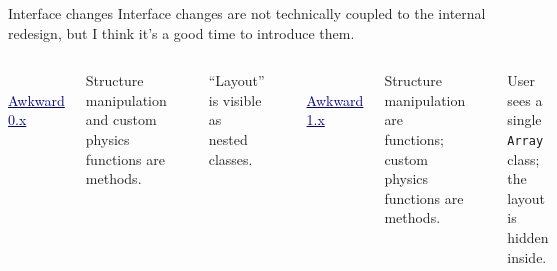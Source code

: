 \documentclass[aspectratio=169]{beamer}
\begin{document}
\begin{frame}[fragile]{Interface changes}
\Large
\vspace{0.25 cm}
Interface changes are not technically coupled to the internal redesign, but I think it's a good time to introduce them.

\normalsize
\vspace{0.5 cm}
\begin{columns}
\mbox{ } \hfill \textcolor{darkblue}{\Large\underline{Awkward 0.x}} \hfill \mbox{ }

\vspace{0.2 cm}
Structure manipulation and custom physics functions are methods.

\small
\begin{verbatim}

x.cross(y)  # cross-join
x.cross(y)  # 3D cross-product
x.colname   # column data
\end{verbatim}

\normalsize
\vspace{0.1 cm}
``Layout'' is visible as nested classes.
\vspace{\baselineskip}

\small
\begin{verbatim}
ChunkedArray(JaggedArray(...))
\end{verbatim}

\mbox{ } \hfill \textcolor{darkblue}{\Large\underline{Awkward 1.x}} \hfill \mbox{ }

\vspace{0.2 cm}
Structure manipulation are functions; custom physics functions are methods.

\small
\begin{verbatim}
import awkward as ak
ak.cross(x, y) # cross-join
x.cross(y)     # 3D cross-product
x.colname      # column data
\end{verbatim}

\normalsize
\vspace{0.1 cm}
User sees a single \texttt{Array} class; the layout is hidden inside.

\small
\begin{verbatim}
Array(...)   # .layout for details
\end{verbatim}

\end{columns}
\end{frame}
\end{document}
